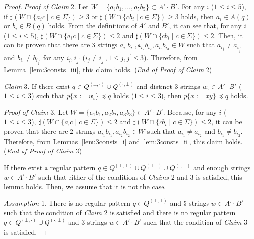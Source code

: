 \begin{proof}
\noindent
\textit{Proof of Claim} 2.
Let $W = \{a_{1}b_{1},\ldots,a_{5}b_{5}\} \subset A'\cdot B'$.
{\color{red}For any $i$ ($1\leq i\leq 5$), if $\sharp (W\cap \{a_{i}c \mid c \in \Sigma\})\geq 3$ or $\sharp (W \cap \{cb_{i} \mid c \in \Sigma\}) \geq 3$ holds, then $a_{i}\in A(q)$ or $b_{i}\in B(q)$ holds.
From the definitions of $A'$ and $B'$, it can see that,  
for any $i$ ($1\leq i\leq 5$), $\sharp (W \cap \{a_{i}c \mid c \in \Sigma\}) \leq 2$ and $\sharp (W \cap \{cb_{i} \mid c \in \Sigma\}) \leq 2$.}
{\color{red} Then,} it can be proven that there are $3$ strings $a_{i_{1}}b_{i_{1}},a_{i_{2}}b_{i_{2}},a_{i_{3}}b_{i_{3}}\in W$ such that $a_{i_{j}} \not= a_{i_{j^{\prime}}}$ and $b_{i_{j}} \not= b_{i_{j^{\prime}}}$ for any $i_{j},i_{j^{\prime}}$ ($i_{j}\not= i_{j^{\prime}}, 1\leq j,j^{\prime}\leq 3$).
Therefore, from Lemma~\ref{lem:3consts_iii}, this claim holds. (\textit{End of Proof of Claim} 2)

\smallskip

\noindent
\textit{Claim} 3. If there exist $q \in Q^{(\bot,\cdot)} \cup Q^{(\cdot,\bot)}$ and distinct $3$ strings $w_{i} \in A'\cdot B'$ ($1\leq i\leq 3$) such that $p \{ x:=w_{i} \} \preceq q$ holds ($1\leq i\leq 3$),  then $p \{ x:=xy \} \preceq q$ holds.

\noindent
\textit{Proof of Claim} 3.
Let $W = \{a_{1}b_{1},a_{2}b_{2},a_{3}b_{3}\} \subset A'\cdot B'$.
Because, for any $i$ ($1\leq i\leq 3$), $\sharp(W \cap \{a_{i}c \mid c \in \Sigma\}) \leq 2$ and  $\sharp (W \cap \{cb_{i} \mid c \in \Sigma\}) \leq 2$, it can be proven that there are $2$ strings $a_{i_{1}}b_{i_{1}},a_{i_{2}}b_{i_{2}}\in W$ such that $a_{i_{1}} \not= a_{i_{2}}$ and $b_{i_{1}} \not= b_{i_{2}}$.
Therefore, from Lemmas~\ref{lem:3consts_i} and \ref{lem:3consts_ii}, this claim holds. (\textit{End of Proof of Claim} 3)

\smallskip

\noindent
If there exist a regular pattern $q \in Q^{(\bot,\bot)} \cup Q^{(\bot,\cdot)} \cup Q^{(\cdot,\bot)}$ and enough strings $w \in A'\cdot B'$ such that either of the conditions of \textit{Claims} 2 and 3 is satisfied, this lemma holds. Then, we assume that it is not the case.

\smallskip

\noindent
\textit{Assumption} 1.
There is no regular pattern $q \in Q^{(\bot,\bot)}$ and $5$ strings $w \in A'\cdot B'$ such that the condition of \textit{Claim} 2 is satisfied and there is no regular pattern $q \in Q^{(\bot,\cdot)} \cup Q^{(\cdot,\bot)}$ and $3$ strings $w \in A'\cdot B'$ such that the condition of \textit{Claim} 3 is satisfied.


\end{proof}
